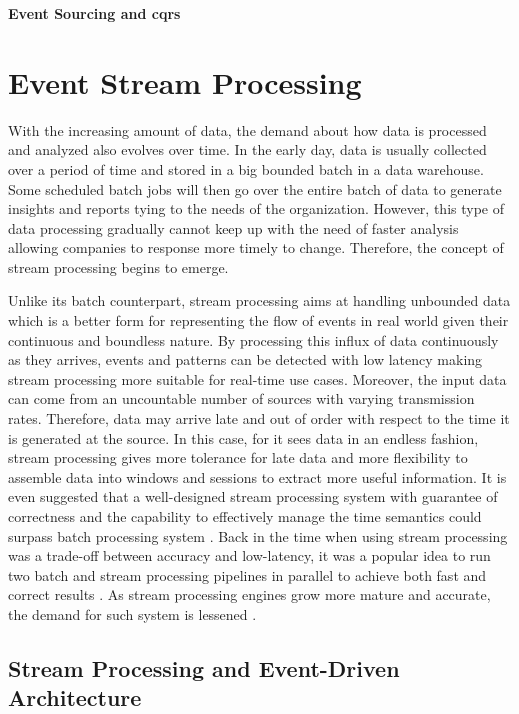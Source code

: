 \textbf{Event Sourcing and \acrfull{cqrs}}\\
 


\section{Event Stream Processing} \label{section:eventstreamprocessing}
With the increasing amount of data, the demand about how data is processed and analyzed also evolves over time. In the early day, data is usually collected over a period of time and stored in a big bounded batch in a data warehouse. Some scheduled batch jobs will then go over the entire batch of data to generate insights and reports tying to the needs of the organization. However, this type of data processing gradually cannot keep up with the need of faster analysis allowing companies to response more timely to change. Therefore, the concept of stream processing begins to emerge.


Unlike its batch counterpart, stream processing aims at handling unbounded data which is a better form for representing the flow of events in real world given their continuous and boundless nature. By processing this influx of data continuously as they arrives, events and patterns can be detected with low latency making stream processing more suitable for real-time use cases. Moreover, the input data can come from an uncountable number of sources with varying transmission rates. Therefore, data may arrive late and out of order with respect to the time it is generated at the source. In this case, for it sees data in an endless fashion, stream processing gives more tolerance for late data and more flexibility to assemble data into windows and sessions to extract more useful information. It is even suggested that a well-designed stream processing system with guarantee of correctness and the capability to effectively manage the time semantics could surpass batch processing system \cite{stream101}. Back in the time when using stream processing was a trade-off between accuracy and low-latency, it was a popular idea to run two batch and stream processing pipelines in parallel to achieve both fast and correct results \cite{lambdaarchitecture}.  As stream processing engines grow more mature and accurate, the demand for such system is lessened \cite{questionlambdaarchitecture}.
\subsection{Stream Processing and Event-Driven Architecture}

